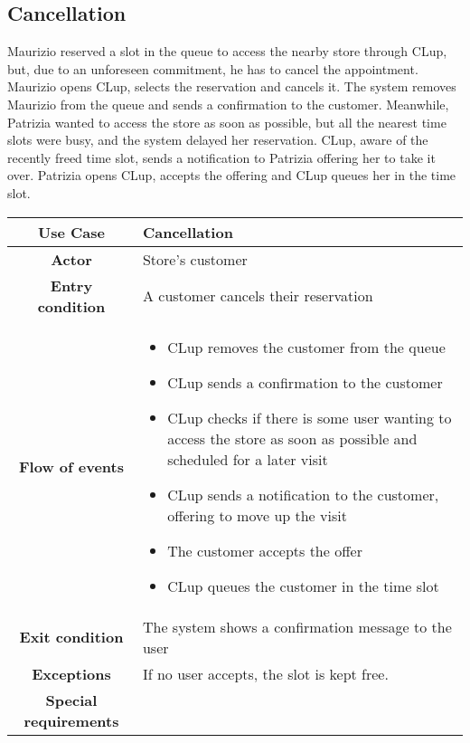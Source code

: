 \documentclass[../../main.tex]{subfiles}
\begin{document}
    \subsection{Cancellation}

    Maurizio reserved a slot in the queue to access the nearby store through CLup, but, due to an unforeseen commitment, 
    he has to cancel the appointment. Maurizio opens CLup, selects the reservation and cancels it. 
    The system removes Maurizio from the queue and sends a confirmation to the customer. 
    Meanwhile, Patrizia wanted to access the store as soon as possible, but all the nearest time slots were busy, 
    and the system delayed her reservation. CLup, aware of the recently freed time slot, sends a notification to Patrizia offering her to take it over. 
    Patrizia opens CLup, accepts the offering and CLup queues her in the time slot.

    \begin{table}[H]
      \centering
        \begin{tabular}{c m{}}
        \hline
        \textbf{Use Case} & Cancellation\\ \hline
        \textbf{Actor} & Store's customer\\ \hline
        \textbf{Entry condition} & A customer cancels their reservation\\  \hline
        \textbf{Flow of events} & \begin{itemize}
                                    \item CLup removes the customer from the queue
                                    \item CLup sends a confirmation to the customer
                                    \item CLup checks if there is some user wanting to access the store as soon as possible and scheduled for a later visit
                                    \item CLup sends a notification to the customer, offering to move up the visit
                                    \item The customer accepts the offer
                                    \item CLup queues the customer in the time slot
                                  \end{itemize}\\ \hline
        \textbf{Exit condition} & The system shows a confirmation message to the user \\ \hline
        \textbf{Exceptions} & If no user accepts, the slot is kept free. \\ \hline
        \textbf{Special requirements} &\\ \hline
        \end{tabular}
    \end{table}
\end{document}
